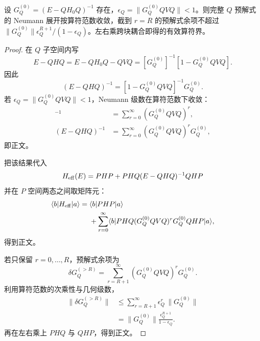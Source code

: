 \begin{theorem}
设 $G_Q^{(0)}=(E-QH_0Q)^{-1}$ 存在，$\epsilon_Q=\|G_Q^{(0)}QVQ\|<1$。则完整 $Q$ 预解式的 Neumann 展开按算符范数收敛，截到 $r=R$ 的预解式余项不超过 $\|G_Q^{(0)}\|\epsilon_Q^{R+1}/(1-\epsilon_Q)$。左右乘跨块耦合即得的有效算符界。
\end{theorem}
\begin{proof}
在 $Q$ 子空间内写
\begin{equation*}
 E-QHQ
 =E-QH_0Q-QVQ
 =[G_Q^{(0)}]^{-1}[1-G_Q^{(0)}QVQ].
\end{equation*}
因此
\begin{equation*}
 (E-QHQ)^{-1}
 =[1-G_Q^{(0)}QVQ]^{-1}G_Q^{(0)}.
\end{equation*}
若 $\epsilon_Q=\|G_Q^{(0)}QVQ\|<1$，Neumann 级数在算符范数下收敛：
\begin{align*}
 [1-G_Q^{(0)}QVQ]^{-1}
 &=\sum_{r=0}^{\infty}(G_Q^{(0)}QVQ)^r,\\
 (E-QHQ)^{-1}
 &=\sum_{r=0}^{\infty}(G_Q^{(0)}QVQ)^rG_Q^{(0)},
\end{align*}
即正文。

把该结果代入
\begin{equation*}
 H_{\rm eff}(E)=PHP+PHQ(E-QHQ)^{-1}QHP
\end{equation*}
并在 $P$ 空间两态之间取矩阵元：
\begin{align*}
 \langle b|H_{\rm eff}|a\rangle
 ={}&\langle b|PHP|a\rangle\\
 &+\sum_{r=0}^{\infty}
 \langle b|PHQ
 (G_Q^{(0)}QVQ)^rG_Q^{(0)}QHP|a\rangle,
\end{align*}
得到正文。

若只保留 $r=0,\ldots,R$，预解式余项为
\begin{equation*}
 \delta G_Q^{(>R)}
 =\sum_{r=R+1}^{\infty}(G_Q^{(0)}QVQ)^rG_Q^{(0)}.
\end{equation*}
利用算符范数的次乘性与几何级数，
\begin{align*}
 \|\delta G_Q^{(>R)}\|
 &\le
 \sum_{r=R+1}^{\infty}\epsilon_Q^r\,\|G_Q^{(0)}\|\\
 &=\|G_Q^{(0)}\|
 \frac{\epsilon_Q^{R+1}}{1-\epsilon_Q}.
\end{align*}
再在左右乘上 $PHQ$ 与 $QHP$，得到正文。
\end{proof}


